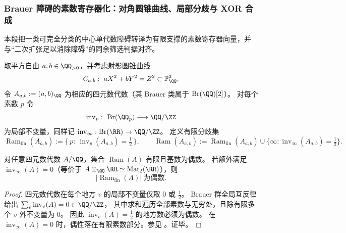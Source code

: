 \subsubsection{Brauer 障碍的素数寄存器化：对角圆锥曲线、局部分歧与 XOR 合成}\label{subsubsec:prime-register-brauer-obstruction}
本段把一类可完全分类的中心单代数障碍转译为有限支撑的素数寄存器向量，并与“二次扩张足以消除障碍”的同余筛选判据对齐。

\begin{definition}\label{def:prime-register-brauer-diagonal-conic-quaternion}
取平方自由 \(a,b\in\QQ_{>0}\)，并考虑射影圆锥曲线
\[
C_{a,b}:\ aX^{2}+bY^{2}=Z^{2}\subset \mathbb{P}^{2}_{\QQ}.
\]
令 \(A_{a,b}:=(a,b)_{\QQ}\) 为相应的四元数代数（其 Brauer 类属于 \(\mathrm{Br}(\QQ)[2]\)）。
对每个素数 \(p\) 令
\[
\operatorname{inv}_p:\ \mathrm{Br}(\QQ_p)\longrightarrow \QQ/\ZZ
\]
为局部不变量，同样记
\(
\operatorname{inv}_\infty:\mathrm{Br}(\RR)\to \QQ/\ZZ
\)。
定义有限分歧集
\[
\operatorname{Ram}_{\mathrm{fin}}(A_{a,b})
:=\{\,p:\ \operatorname{inv}_p(A_{a,b})=\tfrac12\,\},
\qquad
\operatorname{Ram}(A_{a,b})
:=\operatorname{Ram}_{\mathrm{fin}}(A_{a,b})\cup\{\infty:\operatorname{inv}_\infty(A_{a,b})=\tfrac12\}.
\]
\end{definition}

\begin{theorem}[分歧素数集的有限性与偶性]\label{thm:prime-register-brauer-ramification-even}
对任意四元数代数 \(A/\QQ\)，集合 \(\operatorname{Ram}(A)\) 有限且基数为偶数。
若额外满足 \(\operatorname{inv}_\infty(A)=0\)（等价于 \(A\otimes_{\QQ}\RR\simeq \mathrm{Mat}_2(\RR)\)），则
\[
\bigl|\operatorname{Ram}_{\mathrm{fin}}(A)\bigr|\ \text{为偶数}.
\]
\end{theorem}
\begin{proof}
四元数代数在每个地方 \(v\) 的局部不变量仅取 \(0\) 或 \(\tfrac12\)。
Brauer 群全局互反律给出
\(
\sum_{v}\operatorname{inv}_v(A)=0\in\QQ/\ZZ
\)，
其中求和遍历全部素数与无穷处，且除有限多个 \(v\) 外不变量为 \(0\)。
因此 \(\operatorname{inv}_v(A)=\tfrac12\) 的地方数必须为偶数。
在 \(\operatorname{inv}_\infty(A)=0\) 时，偶性落在有限素数部分。参见 \cite{Serre1973CourseArithmetic,VoightQuaternionAlgebras}。证毕。
\end{proof}

